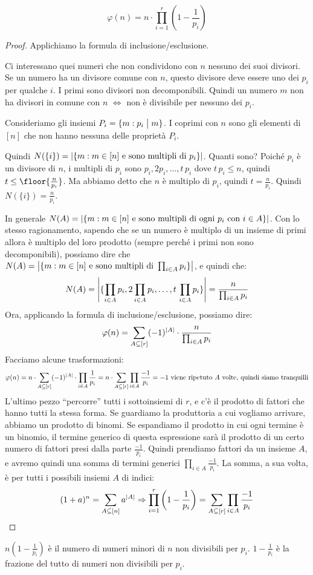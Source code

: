 \begin{theorem}
	\[
		\varphi(n) = n \cdot \prod_{i=1}^{r} \left( 1 - \frac{1}{p_i} \right)
	\]
\end{theorem}

\begin{proof}
	Applichiamo la formula di inclusione/esclusione.

	Ci interessano quei numeri che non condividono con $n$ nessuno dei suoi divisori.
	Se un numero ha un divisore comune con $n$, questo divisore deve essere uno dei $p_i$ per qualche $i$.
	I primi sono divisori non decomponibili.
	Quindi un numero $m$ non ha divisori in comune con $n$ $\iff$ non \`e divisibile per nessuno dei $p_i$.

	Consideriamo gli insiemi $P_i = \{ m : p_i \bigm| m \}$.
	I coprimi con $n$ sono gli elementi di $[n]$ che non hanno nessuna delle propriet\`a $P_i$.

	Quindi $N(\{i\}) = \left\lvert{\{ m : m \in [n] \text{ e sono multipli di } p_i \}}\right\rvert$.
	Quanti sono?
	Poich\'e $p_i$ \`e un divisore di $n$, i multipli di $p_i$ sono $p_i, 2 p_i, \dots, t \, p_i$ dove $t \, p_i \le n$, quindi $t \le \floor{\frac{n}{p_i}}$.
	Ma abbiamo detto che $n$ \`e multiplo di $p_i$, quindi $t = \frac{n}{p_i}$.
	Quindi $N(\{i\}) = \frac{n}{p_i}$.

	In generale $N(A) = \left\lvert{\{m : m \in [n] \text{ e sono multipli di ogni } p_i \text{ con } i \in A \}}\right\rvert$.
	Con lo stesso ragionamento, sapendo che se un numero \`e multiplo di un insieme di primi allora \`e multiplo del loro prodotto (sempre perch\'e i primi non sono decomponibili), possiamo dire che $N(A) = \left\lvert{\{ m : m \in [n] \text{ e sono multipli di } \prod_{i \in A} p_i\}}\right\rvert$, e quindi che:
	\[
		N(A) = \left\lvert{\{ \prod_{i \in A} p_i, 2 \prod_{i \in A} p_i, \dots, t \, \prod_{i \in A} p_i \}}\right\rvert = \frac{n}{\prod_{i \in A} p_i}
	\]
	Ora, applicando la formula di inclusione/esclusione, possiamo dire:
	\[
		\varphi(n) = \sum_{A \subseteq [r]} (-1)^{\left\lvert{A}\right\rvert} \cdot \frac{n}{\prod_{i \in A} p_i}
	\]
	Facciamo alcune trasformazioni:
	\[
		\varphi(n) =  n \cdot \sum_{A \subseteq [r]} (-1)^{\left\lvert{A}\right\rvert} \cdot \prod_{i \in A} \frac{1}{p_i} =
		n \cdot \sum_{A \subseteq [r]} \prod_{i \in A} \frac{-1}{p_i} = \text{$-1$ viene ripetuto $A$ volte, quindi siamo tranquilli}
	\]
	L'ultimo pezzo ``percorre'' tutti i sottoinsiemi di $r$, e c'\`e il prodotto di fattori che hanno tutti la stessa forma.
	Se guardiamo la produttoria a cui vogliamo arrivare, abbiamo un prodotto di binomi.
	Se espandiamo il prodotto in cui ogni termine \`e un binomio, il termine generico di questa espressione sar\`a il prodotto di un certo numero di fattori presi dalla parte $\frac{-1}{p_i}$.
	Quindi prendiamo fattori da un insieme $A$, e avremo quindi una somma di termini generici $\prod_{i \in A} \frac{-1}{p_i}$.
	La somma, a sua volta, \`e per tutti i possibili insiemi $A$ di indici:
	\[
		(1 + a)^n = \sum_{A \subseteq [n]} a^{\left\lvert{A}\right\rvert} \Rightarrow \prod_{i = 1}^{r} \left( 1 - \frac{1}{p_i} \right) = \sum_{A \subseteq [r]} \prod_{i \in A} \frac{-1}{p_i}
	\]
\end{proof}

$n \left( 1 - \frac{1}{p_i} \right)$ \`e il numero di numeri minori di $n$ non divisibili per $p_i$.
$1 - \frac{1}{p_i}$ \`e la frazione del tutto di numeri non divisibili per $p_i$.








